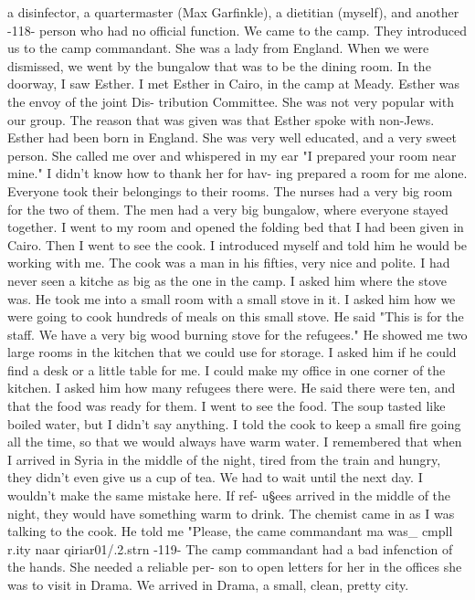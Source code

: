 a disinfector, a quartermaster (Max 
Garfinkle), a dietitian (myself), and another 
-118- 
person who had no official function.
We came to the camp.
They introduced us to 
the camp commandant.
She was a lady from England.
When we were dismissed, we went 
by the bungalow that was to be the dining room.
In the doorway, I saw Esther.
I 
met Esther in Cairo, in the camp at Meady.
Esther was the envoy of the joint Dis-
tribution Committee.
She was not very popular with our group.
The reason that was 
given was that Esther spoke with non-Jews.
Esther had been born in England.
She 
was very well educated, and a very sweet person.
She called me over and whispered 
in my ear "I prepared your room near mine."
I didn't know how to thank her for hav-
ing prepared a room for me alone.
Everyone took their belongings to their rooms.
The nurses had a very big room 
for the two of them.
The men had a very big bungalow, where everyone stayed together.
I went to my room and opened the folding bed that I had been given in Cairo.
Then 
I went to see the cook.
I introduced myself and told him he would be working with 
me.
The cook was a man in his fifties, very nice and polite.
I had never seen a kitche 
as big as the one in the camp.
I asked him where the stove was.
He took me into a 
small room with a small stove in it.
I asked him how we were going to cook hundreds 
of meals on this small stove.
He said "This is for the staff.
We have a very big 
wood burning stove for the refugees."
He showed me two large rooms in the kitchen that we could use for storage.
I 
asked him if he could find a desk or a little table for me.
I could make my 
office in one corner of the kitchen.
I asked him how many refugees there were.
He 
said there were ten, and that the food was ready for them.
I went to see the food.
The soup tasted like boiled water, but I didn't say 
anything.
I told the cook to keep a small fire going all the time, so that we would 
always have warm water.
I remembered that when I arrived in Syria in the middle of 
the night, tired from the train and hungry, they didn't even give us a cup of tea.
We had to wait until the next day.
I wouldn't make the same mistake here.
If ref-
u§ees arrived in the middle of the night, they would have something warm to drink.
The chemist came in as I was talking to the cook.
He told me "Please, the 
came commandant ma 
was_ 
cmpll r.ity naar qiriar01/.2.strn 
-119- 
The camp commandant had a bad infenction of the hands.
She needed a reliable per-
son to open letters for her in the offices she was to visit in Drama.
We arrived in Drama, a small, clean, pretty city.
